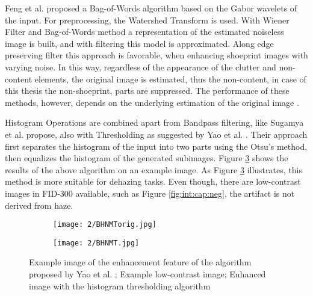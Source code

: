 \documentclass[draft,final]{vutinfth} %
\begin{document}
Feng et al. \cite{feng2011bag} proposed a Bag-of-Words algorithm based on the Gabor wavelets of the input. 
For preprocessing, the Watershed Transform is used.
With Wiener Filter and Bag-of-Words method a representation of the estimated noiseless image is built, and with filtering this model is approximated.
Along edge preserving filter this approach is favorable, when enhancing shoeprint images with varying noise.
In this way, regardless of the appearance of the clutter and non-content elements, the original image is estimated, thus the non-content, in case of this thesis the non-shoeprint, parts are suppressed.
The performance of these methods, however, depends on the underlying estimation of the original image \cite{li2014rapid}.
\par
Histogram Operations are combined apart from Bandpass filtering, like Sugamya et al. \cite{sugamya2016image} propose, also with Thresholding as suggested by Yao et al. \cite{yao2016image}. 
Their approach first separates the histogram of the input into two parts using the Otsu's method, then equalizes the histogram of the generated subimages. 
Figure \ref{fig:rw:BHNMT} shows the results of the above algorithm on an example image.
As Figure \ref{fig:rw:BHNMT} illustrates, this method is more suitable for dehazing tasks. 
Even though, there are low-contrast images in FID-300 available, such as Figure \ref{fig:int:cap:neg}, the artifact is not derived from haze.

\begin{figure}[h]
  \centering
  \begin{subfigure}[t]{0.4\columnwidth}
    \centering
    \texttt{[image: 2/BHNMTorig.jpg]}
    \subcaption{}
    \label{fig:rw:BHNMTin}
  \end{subfigure}
  \begin{subfigure}[t]{0.4\columnwidth}
    \centering
    \texttt{[image: 2/BHNMT.jpg]}
    \subcaption{}
    \label{fig:rw:BHNMTout}
  \end{subfigure}
  \caption{Example image of the enhancement feature of the algorithm proposed by Yao et al. \cite{yao2016image};
			 Example low-contrast image;  Enhanced image with the histogram thresholding algorithm}
  \label{fig:rw:BHNMT} %
\end{figure}
\end{document}
